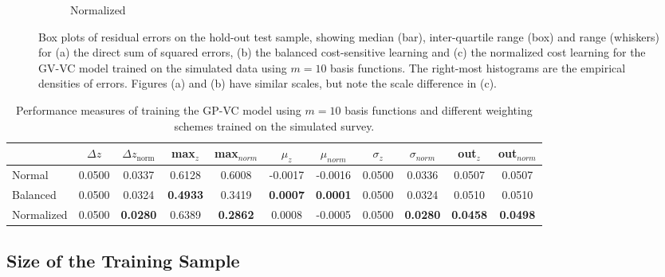 \documentclass[useAMS,usenatbib,fleqn]{mn2e}
\begin{document}
\begin{figure}
\begin{subfigure}[b]{\columnwidth}
                \caption{Normalized}
                \label{fig-normalized}
        \end{subfigure}
       \caption{Box plots of residual errors on the hold-out test sample, showing median (bar), inter-quartile range (box) and range (whiskers) for (a) the direct sum of squared errors, (b) the balanced cost-sensitive learning and (c) the normalized cost learning for the GV-VC model trained on the simulated data using $m=10$ basis functions. The right-most histograms are the empirical densities of errors. Figures (a) and (b) have similar scales, but note the scale difference in (c).}
	\label{fig-normal-balanced}
\end{figure}

 \begin{table}
\caption{Performance measures of training the GP-VC model using $m=10$ basis functions and different weighting schemes trained on the simulated survey.}
\begin{center}
\begin{tabular}{| l | c | c |  c | c |  c | c |  c | c |  c | c | }
     				&	$\Delta z$	&	$\Delta z_\textrm{norm}$	&	max$_{z}$ & max$_{norm}$		&	$\mu_{z}$&	$\mu_{norm}$	& $\sigma_{z}$ & $\sigma_{norm}$ & out$_{z}$&out$_{norm}$\\	\hline
	Normal		&	0.0500	&	0.0337		&	0.6128		&	0.6008&	-0.0017		&	-0.0016&	0.0500		&	0.0336&	0.0507		&	0.0507\\
	Balanced		&	0.0500 	&	0.0324		&	\textbf{0.4933}	&	0.3419&	\textbf{0.0007}		&	\textbf{0.0001}&	0.0500		&	0.0324&	0.0510 	&	0.0510	\\
	Normalized	&	0.0500 	&	\textbf{0.0280}	&	0.6389		&	\textbf{0.2862}&	0.0008			&	-0.0005&	0.0500		&	\textbf{0.0280}&	\textbf{0.0458}	&	\textbf{0.0498	}\\\hline
  \end{tabular}
\end{center}
\label{table-normal-balanced}
\end{table}

\subsection{Size of the Training Sample}
\label{sec-sizetraining}
\end{document}
